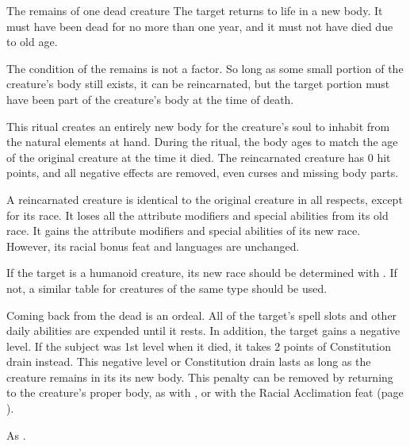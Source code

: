 \begin{spelltarget}{The remains of one dead creature}
    \spelleffect The target returns to life in a new body. It must have been dead for no more than one year, and it must not have died due to old age.

    The condition of the remains is not a factor. So long as some small portion of the creature's body still exists, it can be reincarnated, but the target portion must have been part of the creature's body at the time of death.

    This ritual creates an entirely new body for the creature's soul to inhabit from the natural elements at hand. During the ritual, the body ages to match the age of the original creature at the time it died. The reincarnated creature has 0 hit points, and all negative effects are removed, even curses and missing body parts.

    A reincarnated creature is identical to the original creature in all respects, except for its race. It loses all the attribute modifiers and special abilities from its old race. It gains the attribute modifiers and special abilities of its new race. However, its racial bonus feat and languages are unchanged.

    If the target is a humanoid creature, its new race should be determined with . If not, a similar table for creatures of the same type should be used.

    Coming back from the dead is an ordeal. All of the target's spell slots and other daily abilities are expended until it rests. In addition, the target gains a negative level. If the subject was 1st level when it died, it takes 2 points of Constitution drain instead. This negative level or Constitution drain lasts as long as the creature remains in its its new body. This penalty can be removed by returning to the creature's proper body, as with , or with the Racial Acclimation feat (page ).
\end{spelltarget}

\spellnotes As .


